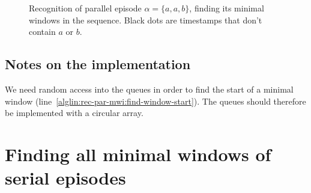 \begin{figure}

\caption{Recognition of parallel episode $ \alpha = \{ a, a, b \} $, finding its minimal windows in the sequence. Black dots are timestamps that don't contain $ a $ or $ b $.}
\label{fig:parallel-minimal-recognition}
\end{figure}

\subsection{Notes on the implementation}

We need random access into the queues in order to find the start of a minimal window (line~\ref{alglin:rec-par-mwi:find-window-start}). The queues should therefore be implemented with a circular array.


\section{Finding all minimal windows of serial episodes}
\label{sec:rec-ser-mwi}

